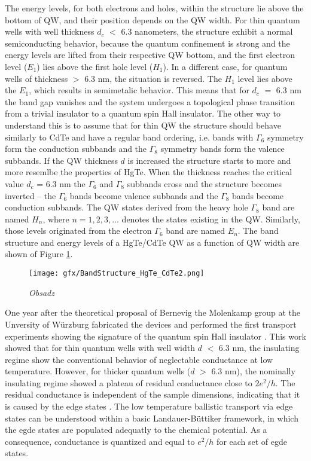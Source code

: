 \documentclass[titlepage,a4paper]{book}
\begin{document}
The energy levels, for both electrons and holes, within the structure lie above the bottom of QW, and their position depends on the QW width. For thin quantum wells with well thickness $d_c$ $<$ 6.3 nanometers, the structure exhibit a normal semiconducting behavior, because the quantum confinement is strong and the energy levels are lifted from their respective QW bottom, and the first electron level ($E_1$) lies above the first hole level ($H_1$). In a different case, for quantum wells of thickness $>$ 6.3 nm, the situation is reversed. The $H_1$ level lies above the $E_1$, which results in semimetalic behavior. This means that for $d_c$ $=$ 6.3 nm the band gap vanishes and the system undergoes a topological phase transition from a trivial insulator to a quantum spin Hall insulator. The other way to understand this is to assume that for thin QW the structure should behave similarly to CdTe and have a regular band ordering, i.e. bands with $\Gamma_6$ symmetry form the conduction subbands and the $\Gamma_8$ symmetry bands form the valence subbands. If the QW thickness $d$ is increased the structure starts to more and more resemlbe the properties of HgTe. When the thickness reaches the critical value $d_c$ = 6.3 nm the $\Gamma_6$ and $\Gamma_8$ subbands cross and the structure becomes inverted -- the $\Gamma_6$ bands become valence subbands and the $\Gamma_8$ bands become conduction subbands. The QW states derived from the heavy hole $\Gamma_8$ band are named $H_n$, where $n = 1, 2, 3, ...$ denotes the states existing in the QW. Similarly, those levels originated from the electron $\Gamma_6$ band are named $E_n$. The band structure and energy levels of a HgTe/CdTe QW as a function of QW width are shown of Figure \ref{fig:BandStructure_HgTe_CdTe2}.  

\begin{figure}[ht]
	\centering
	\texttt{[image: gfx/BandStructure\_HgTe\_CdTe2.png]}
	\vspace{-10pt}
	\caption{\textit{Obsadz}}
	\label{fig:BandStructure_HgTe_CdTe2}
\end{figure} 

One year after the theoretical proposal of Bernevig \cite{Bernevig_Topology2} the Molenkamp group at the Unversity of Würzburg fabricated the devices and performed the first transport experiments showing the signature of the quantum spin Hall insulator \cite{Konig_Topology}. This work showed that for thin quantum wells with well width $d$ $<$ 6.3 nm, the insulating regime show the conventional behavior of neglectable conductance at low temperature. However, for thicker quantum wells ($d$ $>$ 6.3 nm), the nominally insulating regime showed a plateau of residual conductance close to $2e^2/h$. The residual conductance is independent of the sample dimensions, indicating that it is caused by the edge states \cite{Konig_Topology}. The low temperature ballistic transport via edge states can be understood within a basic Landauer-Büttiker \cite{Landauer_MCT} framework, in which the egde states are populated adequatly to the chemical potential. As a consequence, conductance is quantized and equal to $e^2/h$ for each set of egde states.
\end{document}
